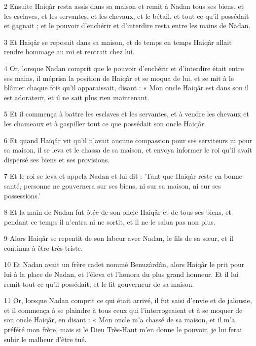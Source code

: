 \par 2 Ensuite Haiqâr resta assis dans sa maison et remit à Nadan tous ses biens, et les esclaves, et les servantes, et les chevaux, et le bétail, et tout ce qu'il possédait et gagnait ; et le pouvoir d'enchérir et d'interdire resta entre les mains de Nadan.

\par 3 Et Haiqâr se reposait dans sa maison, et de temps en temps Haiqâr allait rendre hommage au roi et rentrait chez lui.

\par 4 Or, lorsque Nadan comprit que le pouvoir d'enchérir et d'interdire était entre ses mains, il méprisa la position de Haiqâr et se moqua de lui, et se mit à le blâmer chaque fois qu'il apparaissait, disant : « Mon oncle Haiqâr est dans son il est adorateur, et il ne sait plus rien maintenant.

\par 5 Et il commença à battre les esclaves et les servantes, et à vendre les chevaux et les chameaux et à gaspiller tout ce que possédait son oncle Haiqâr.

\par 6 Et quand Haïqâr vit qu'il n'avait aucune compassion pour ses serviteurs ni pour sa maison, il se leva et le chassa de sa maison, et envoya informer le roi qu'il avait dispersé ses biens et ses provisions.

\par 7 Et le roi se leva et appela Nadan et lui dit : 'Tant que Haiqâr reste en bonne santé, personne ne gouvernera sur ses biens, ni sur sa maison, ni sur ses possessions.'

\par 8 Et la main de Nadan fut ôtée de son oncle Haiqâr et de tous ses biens, et pendant ce temps il n'entra ni ne sortit, et il ne le salua pas non plus.

\par 9 Alors Haiqâr se repentit de son labeur avec Nadan, le fils de sa sœur, et il continua à être très triste.

\par 10 Et Nadan avait un frère cadet nommé Benuzârdân, alors Haiqâr le prit pour lui à la place de Nadan, et l'éleva et l'honora du plus grand honneur. Et il lui remit tout ce qu'il possédait, et le fit gouverneur de sa maison.

\par 11 Or, lorsque Nadan comprit ce qui était arrivé, il fut saisi d'envie et de jalousie, et il commença à se plaindre à tous ceux qui l'interrogeaient et à se moquer de son oncle Haiqâr, en disant : « Mon oncle m'a chassé de sa maison, et il m'a préféré mon frère, mais si le Dieu Très-Haut m'en donne le pouvoir, je lui ferai subir le malheur d'être tué.

